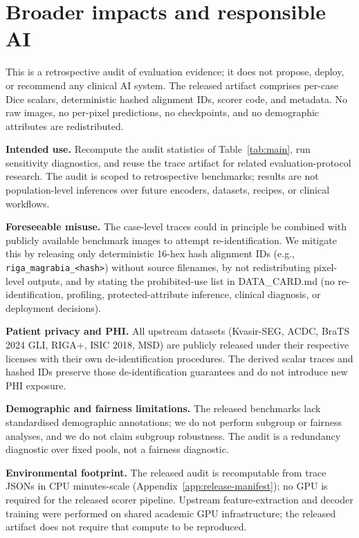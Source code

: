 \section{Broader impacts and responsible AI}
\label{app:broader-impacts}

This is a retrospective audit of evaluation evidence; it does not propose, deploy, or recommend any clinical AI system. The released artifact comprises per-case Dice scalars, deterministic hashed alignment IDs, scorer code, and metadata. No raw images, no per-pixel predictions, no checkpoints, and no demographic attributes are redistributed.

\textbf{Intended use.} Recompute the audit statistics of Table~\ref{tab:main}, run sensitivity diagnostics, and reuse the trace artifact for related evaluation-protocol research. The audit is scoped to retrospective benchmarks; results are not population-level inferences over future encoders, datasets, recipes, or clinical workflows.

\textbf{Foreseeable misuse.} The case-level traces could in principle be combined with publicly available benchmark images to attempt re-identification. We mitigate this by releasing only deterministic 16-hex hash alignment IDs (e.g., \texttt{riga\_magrabia\_<hash>}) without source filenames, by not redistributing pixel-level outputs, and by stating the prohibited-use list in DATA\_CARD.md (no re-identification, profiling, protected-attribute inference, clinical diagnosis, or deployment decisions).

\textbf{Patient privacy and PHI.} All upstream datasets (Kvasir-SEG, ACDC, BraTS 2024 GLI, RIGA+, ISIC 2018, MSD) are publicly released under their respective licenses with their own de-identification procedures. The derived scalar traces and hashed IDs preserve those de-identification guarantees and do not introduce new PHI exposure.

\textbf{Demographic and fairness limitations.} The released benchmarks lack standardised demographic annotations; we do not perform subgroup or fairness analyses, and we do not claim subgroup robustness. The audit is a redundancy diagnostic over fixed pools, not a fairness diagnostic.

\textbf{Environmental footprint.} The released audit is recomputable from trace JSONs in CPU minutes-scale (Appendix~\ref{app:release-manifest}); no GPU is required for the released scorer pipeline. Upstream feature-extraction and decoder training were performed on shared academic GPU infrastructure; the released artifact does not require that compute to be reproduced.

